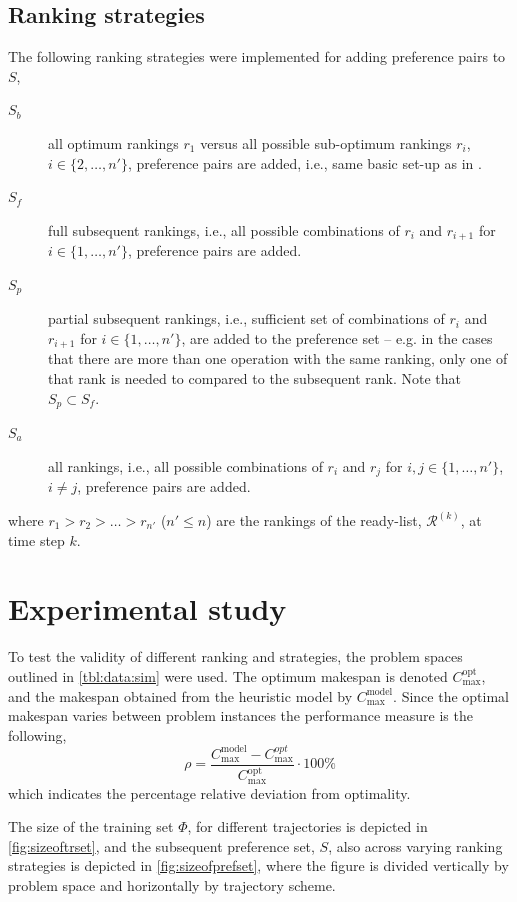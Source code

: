 \documentclass[smallextended]{llncs}
\begin{document}
\subsection{Ranking strategies}\label{sec:ranks}
The following ranking strategies were implemented for adding preference pairs to $S$,
\begin{description}
\item[$S_b$] all optimum rankings $r_1$ versus all possible sub-optimum rankings $r_i$, $i\in\{2,\ldots,n'\}$, preference pairs are added, i.e., same basic set-up as in \cite{InRu11a}. %
\item[$S_f$] full subsequent rankings, i.e., all possible combinations of $r_i$ and $r_{i+1}$ for $i\in\{1,\ldots,n'\}$, preference pairs are added.
\item[$S_p$] partial subsequent rankings, i.e., sufficient set of combinations of $r_i$ and $r_{i+1}$ for $i\in\{1,\ldots,n'\}$, are added to the preference set -- e.g. in the cases that there are more than one operation with the same ranking, only one of that rank is needed to compared to the subsequent rank. Note that $S_p\subset S_f$.
\item[$S_a$] all rankings, i.e., all possible combinations of $r_i$ and $r_j$ for $i,j\in\{1,\ldots,n'\}$, \mbox{$i\neq j$}, preference pairs are added.
\end{description}
where $r_1>r_2>\ldots>r_{n'}$ ($n'\leq n$) are the rankings of the ready-list, $\mathcal{R}^{(k)}$, at time step $k$.


\section{Experimental study}\label{sec:expr}
To test the validity of different ranking and strategies, the problem spaces outlined in \cref{tbl:data:sim} were used. The optimum makespan is denoted 
$C_{\max}^{\text{opt}}$, and the makespan obtained from the heuristic model by $C_{\max}^{\text{model}}$. Since 
the optimal makespan varies between problem instances the performance measure is the following, 
\begin{equation}\label{eq:ratio}\rho=\frac{C_{\max}^{\text{model}}-C_{\max}^{opt}}{C_{\max}^{\text{opt}}}\cdot 
100\%\end{equation}
which indicates the percentage relative deviation from optimality. 

The size of the training set $\Phi$, for different trajectories is depicted in \cref{fig:sizeoftrset}, and the subsequent preference set, $S$, also across varying ranking strategies is depicted in \cref{fig:sizeofprefset}, where the figure is divided vertically by problem space and horizontally by trajectory scheme.
 
\end{document}
